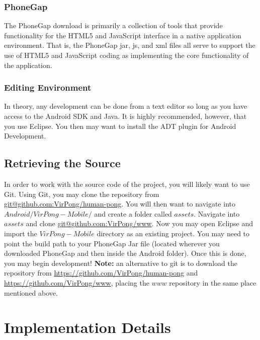 \documentclass[12pt]{article}
\begin{document}
\subsubsection{PhoneGap}
The PhoneGap download is primarily a collection of tools that provide functionality for the HTML5 and JavaScript interface in a native application environment.  That is, the PhoneGap jar, js, and xml files all serve to support the use of HTML5 and JavaScript coding as implementing the core functionality of the application.   

\subsubsection{Editing Environment}
In theory, any development can be done from a text editor so long as you have access to the Android SDK and Java.  It is highly recommended, however, that you use Eclipse\cite{Eclipse-Helios}.  You then may want to install the ADT plugin for Android Development\cite{Eclipse-ADT}.

\subsection{Retrieving the Source}
In order to work with the source code of the project, you will likely want to use Git\cite{Github}.  Using Git, you may clone the repository from \url{git@github.com:VirPong/human-pong}.  You will then want to navigate into $Android/VirPong-Mobile/$ and create a folder called $assets$.  Navigate into $assets$ and clone \url{git@github.com:VirPong/www}.  Now you may open Eclipse and import the $VirPong-Mobile$ directory as an existing project.  You may need to point the build path to your PhoneGap Jar file (located wherever you downloaded PhoneGap and then inside the Android folder).  Once this is done, you may begin development!  \textbf{Note:} an alternative to git is to download the repository from \url{https://github.com/VirPong/human-pong} and \url{https://github.com/VirPong/www}, placing the $www$ repository in the same place mentioned above.



\section{Implementation Details}
\end{document}
